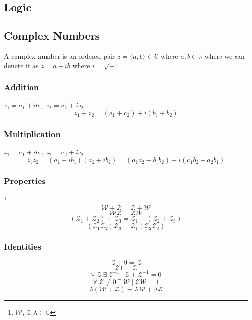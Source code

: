 \subsection{Logic}

\subsection{Complex Numbers}
\label{appendix_a}
A complex number is an ordered pair $z = \{a,b\} \in \mathbb{C}$ where $a,b \in \mathbb{R}$ where we can denote it as $z = a + ib$ where $i = \sqrt{-1}$
\subsubsection{Addition}
$z_{1} = a_{1} + ib_{1}, \ z_{2} = a_{2} + ib_{2}$
$$z_{1} + z_{2} =  (a_{1} + a_{2}) + i(b_{1} + b_{2})$$
\subsubsection{Multiplication}
$z_{1} = a_{1} + ib_{1}, \ z_{2} = a_{2} + ib_{2}$
$$z_{1}z_{2} =  (a_{1} + ib_{1})(a_{2} + ib_{2}) = (a_{1}a_{2} - b_{1}b_{2}) + i(a_{1}b_{2} + a_{2}b_{1})$$
\subsubsection{Properties}\footnote{$\mathcal{W}, \mathcal{Z}, \lambda \in \mathbb{C}$}
$$\mathcal{W} + \mathcal{Z} = \mathcal{Z} + \mathcal{W}$$
$$\mathcal{W}\mathcal{Z} = \mathcal{Z}\mathcal{W}$$
$$(\mathcal{Z}_1 + \mathcal{Z}_2) + \mathcal{Z}_3 = \mathcal{Z}_1 + (\mathcal{Z}_2 + \mathcal{Z}_3)$$
$$(\mathcal{Z}_1\mathcal{Z}_2)\mathcal{Z}_3 = \mathcal{Z}_1(\mathcal{Z}_2\mathcal{Z}_3)$$
\subsubsection{Identities}
$$\mathcal{Z} + 0 = \mathcal{Z}$$
$$\mathcal{Z}1 = \mathcal{Z}$$
$$\forall \ \mathcal{Z} \ \exists \ \mathcal{Z}^{-1} \ | \ \mathcal{Z} + \mathcal{Z}^{-1} = 0$$
$$\forall \  \mathcal{Z} \neq 0 \ \exists \ \mathcal{W} \ | \ \mathcal{Z}\mathcal{W} = 1$$
$$\lambda(\mathcal{W} + \mathcal{Z}) = \lambda\mathcal{W} + \lambda\mathcal{Z}$$



